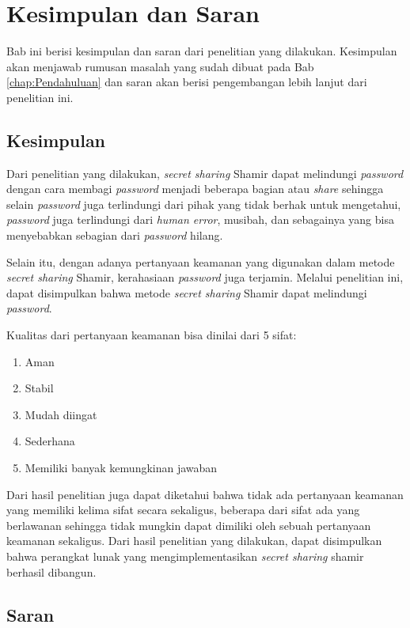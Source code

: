 \chapter{Kesimpulan dan Saran}
\label{chap:Kesimpulan dan Saran}

Bab ini berisi kesimpulan dan saran dari penelitian yang dilakukan. Kesimpulan akan menjawab rumusan masalah yang sudah dibuat pada Bab \ref{chap:Pendahuluan} dan saran akan berisi pengembangan lebih lanjut dari penelitian ini.

\section{Kesimpulan}

Dari penelitian yang dilakukan, \textit{secret sharing} Shamir dapat melindungi \textit{password} dengan cara membagi \textit{password} menjadi beberapa bagian atau \textit{share} sehingga selain \textit{password} juga terlindungi dari pihak yang tidak berhak untuk mengetahui, \textit{password} juga terlindungi dari \textit{human error}, musibah, dan sebagainya yang bisa menyebabkan sebagian dari \textit{password} hilang.

Selain itu, dengan adanya pertanyaan keamanan yang digunakan dalam metode \textit{secret sharing} Shamir, kerahasiaan \textit{password} juga terjamin. Melalui penelitian ini, dapat disimpulkan bahwa metode \textit{secret sharing} Shamir dapat melindungi \textit{password}.

Kualitas dari pertanyaan keamanan bisa dinilai dari 5 sifat:
\begin{enumerate}[itemsep=0mm]
	\item Aman
	\item Stabil
	\item Mudah diingat
	\item Sederhana
	\item Memiliki banyak kemungkinan jawaban
\end{enumerate}
Dari hasil penelitian juga dapat diketahui bahwa tidak ada pertanyaan keamanan yang memiliki kelima sifat secara sekaligus, beberapa dari sifat ada yang berlawanan sehingga tidak mungkin dapat dimiliki oleh sebuah pertanyaan keamanan sekaligus.
Dari hasil penelitian yang dilakukan, dapat disimpulkan bahwa perangkat lunak yang mengimplementasikan \textit{secret sharing} shamir berhasil dibangun.

\section{Saran}

